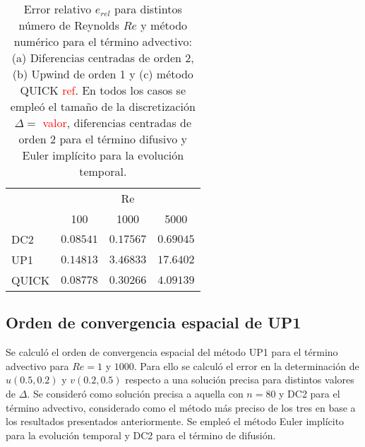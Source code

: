 \documentclass[aps,prb,twocolumn,superscriptaddress,floatfix,longbibliography,10pt]{revtex4-2}
\newcounter{para}
\begin{document}
\twocolumngrid



\begin{table}[]
  \begin{tabular}{l|lll|}
  \cline{2-4}
            & \multicolumn{3}{c|}{Re}                                     \\ \cline{2-4} 

            & \multicolumn{1}{c|}{100} & \multicolumn{1}{c|}{1000} &  \multicolumn{1}{c|}{5000} \\ \hline
  \multicolumn{1}{|l|}{DC2} & \multicolumn{1}{c|}{$0.08541$} & \multicolumn{1}{c|}{$0.17567$} & $0.69045$ \\ \hline
  \multicolumn{1}{|l|}{UP1} & \multicolumn{1}{c|}{$0.14813$} & \multicolumn{1}{c|}{$3.46833$} & $17.6402$ \\ \hline
  \multicolumn{1}{|l|}{QUICK} & \multicolumn{1}{c|}{$0.08778$} & \multicolumn{1}{c|}{$0.30266$} & $4.09139$ \\ \hline
  \end{tabular}
  \label{tabla:erel}
  \caption{Error relativo $e_{rel}$ para distintos número de Reynolds $Re$ y método numérico para el término advectivo: (a) Diferencias centradas de orden 2, (b) Upwind de orden 1 y (c) método QUICK \textcolor{red}{ref}. En todos los casos se empleó el tamaño de la discretización $\Delta = $ \textcolor{red}{valor}, diferencias centradas de orden 2 para el término difusivo y Euler implícito para la evolución temporal.}
\end{table}






\subsection{Orden de convergencia espacial de UP1}
Se calculó el orden de convergencia espacial del método UP1 para el término advectivo para $Re = 1$ y $1000$. Para ello se calculó el error en la determinación de $u(0.5, 0.2)$ y $v(0.2, 0.5)$ respecto a una solución precisa para distintos valores de $\Delta$. Se consideró como solución precisa a aquella con $n = 80$ y DC2 para el término advectivo, considerado como el método más preciso de los tres en base a los resultados presentados anteriormente. Se empleó el método Euler implícito para la evolución temporal y DC2 para el término de difusión.
\end{document}
